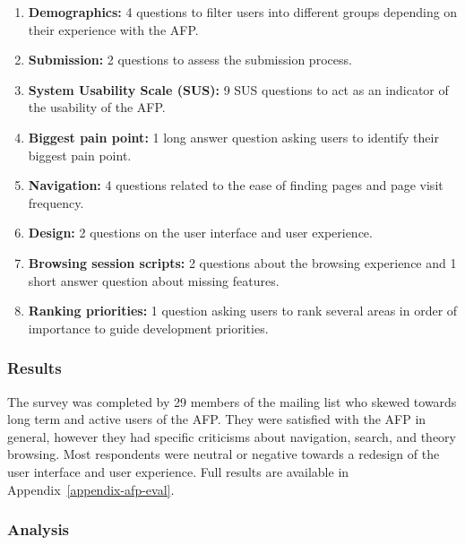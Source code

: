 \documentclass[bsc,frontabs,oneside,singlespacing,parskip,deptreport,logo]{infthesis}
\begin{document}
\begin{enumerate}
  \item \textbf{Demographics:} 4 questions to filter users into different groups depending on their experience with the AFP\@.
  \item \textbf{Submission:} 2 questions to assess the submission process.
  \item \textbf{System Usability Scale (SUS):} 9 SUS \cite{brooke1996sus} questions to act as an indicator of the usability of the AFP\@.
  \item \textbf{Biggest pain point:} 1 long answer question asking users to identify their biggest pain point.
  \item \textbf{Navigation:} 4 questions related to the ease of finding pages and page visit frequency.
  \item \textbf{Design:} 2 questions on the user interface and user experience.
  \item \textbf{Browsing session scripts:} 2 questions about the browsing experience and 1 short answer question about missing features.
  \item \textbf{Ranking priorities:} 1 question asking users to rank several areas in order of importance  to guide development priorities. 
\end{enumerate}


\subsubsection{Results} \label{mailingListResults}

The survey was completed by 29 members of the mailing list who skewed towards long term and active users of the AFP\@. They were satisfied with the AFP in general, however they had specific criticisms about navigation, search, and theory browsing. Most respondents were neutral or negative towards a redesign of the user interface and user experience. Full results are available in Appendix~\ref{appendix-afp-eval}.


\subsubsection{Analysis}
\end{document}
